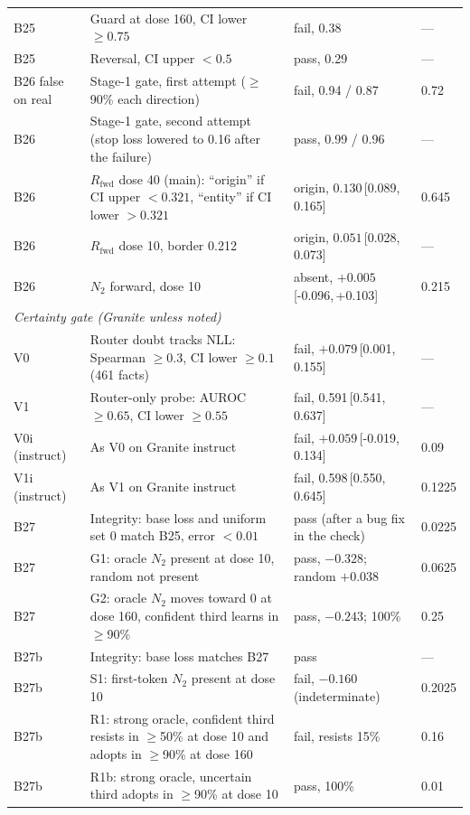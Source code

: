 \documentclass[11pt]{article}
\newcommand{\NTwo}{\ensuremath{N_2}}
\newcommand{\ci}[2]{\,[#1,\,#2]}
\begin{document}
\begin{longtable}{p{2.1cm}p{6.6cm}p{4.6cm}p{1.1cm}}
B25 & Guard at dose 160, CI lower $\ge0.75$ & fail, 0.38 & --- \\
B25 & Reversal, CI upper $<0.5$ & pass, 0.29 & --- \\
B26 false on real & Stage-1 gate, first attempt ($\ge$90\% each direction) & fail, 0.94 / 0.87 & 0.72 \\
B26 & Stage-1 gate, second attempt (stop loss lowered to 0.16 after the failure) & pass, 0.99 / 0.96 & --- \\
B26 & $R_{\text{fwd}}$ dose 40 (main): ``origin'' if CI upper $<0.321$, ``entity'' if CI lower $>0.321$ & origin, $0.130$\ci{0.089}{0.165} & 0.645 \\
B26 & $R_{\text{fwd}}$ dose 10, border 0.212 & origin, $0.051$\ci{0.028}{0.073} & --- \\
B26 & \NTwo{} forward, dose 10 & absent, $+0.005$\ci{-0.096}{+0.103} & 0.215 \\
\midrule
\multicolumn{4}{l}{\textit{Certainty gate (Granite unless noted)}} \\
V0 & Router doubt tracks NLL: Spearman $\ge0.3$, CI lower $\ge0.1$ (461 facts) & fail, $+0.079$\ci{0.001}{0.155} & --- \\
V1 & Router-only probe: AUROC $\ge0.65$, CI lower $\ge0.55$ & fail, 0.591\ci{0.541}{0.637} & --- \\
V0i (instruct) & As V0 on Granite instruct & fail, $+0.059$\ci{-0.019}{0.134} & 0.09 \\
V1i (instruct) & As V1 on Granite instruct & fail, 0.598\ci{0.550}{0.645} & 0.1225 \\
B27 & Integrity: base loss and uniform set 0 match B25, error $<0.01$ & pass (after a bug fix in the check) & 0.0225 \\
B27 & G1: oracle \NTwo{} present at dose 10, random not present & pass, $-0.328$; random $+0.038$ & 0.0625 \\
B27 & G2: oracle \NTwo{} moves toward 0 at dose 160, confident third learns in $\ge$90\% & pass, $-0.243$; 100\% & 0.25 \\
B27b & Integrity: base loss matches B27 & pass & --- \\
B27b & S1: first-token \NTwo{} present at dose 10 & fail, $-0.160$ (indeterminate) & 0.2025 \\
B27b & R1: strong oracle, confident third resists in $\ge$50\% at dose 10 and adopts in $\ge$90\% at dose 160 & fail, resists 15\% & 0.16 \\
B27b & R1b: strong oracle, uncertain third adopts in $\ge$90\% at dose 10 & pass, 100\% & 0.01 \\

\end{longtable}
\end{document}
